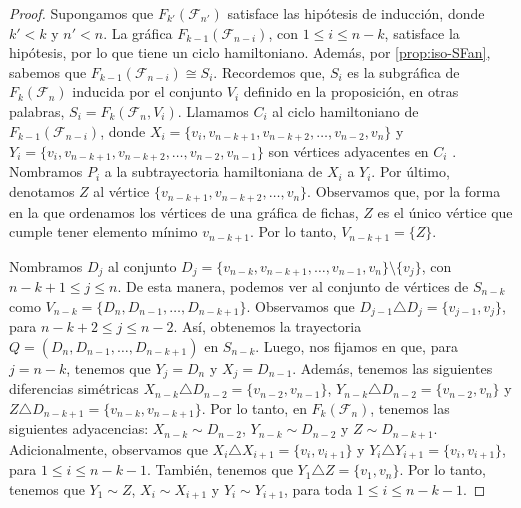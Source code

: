 \begin{proof}
    Supongamos que $F_{k'}(\mathcal{F}_{n'})$ satisface las hip\'otesis de
    inducci\'on, donde $k'< k$ y $n'<n$. La gr\'afica
    $F_{k-1}(\mathcal{F}_{n-i})$, con $1 \leq i \leq n-k$, satisface la
    hip\'otesis, por lo que tiene un ciclo hamiltoniano. Adem\'as, por
    \cref{prop:iso-SFan}, sabemos que 
    \linebreak
    $F_{k-1}(\mathcal{F}_{n-i}) \cong S_i$. Recordemos que,  $S_i$ es la
    subgr\'afica de $F_k(\mathcal{F}_n)$ inducida por el conjunto $V_i$ definido
    en la proposici\'on, en otras palabras, $S_i= F_k(\mathcal{F}_n, V_i)$.
    Llamamos $C_i$ al ciclo hamiltoniano de $F_{k-1}(\mathcal{F}_{n-i})$, donde
    $X_i = \{v_i, v_{n-k+1}, v_{n-k+2}, \dots, v_{n-2}, v_n\}$ y $Y_i= \{v_i,
    v_{n-k+1}, v_{n-k+2}, \dots, v_{n-2}, v_{n-1}\}$ son v\'ertices adyacentes
    en $C_i$ . Nombramos $P_i$ a la subtrayectoria hamiltoniana de $X_i$ a
    $Y_i$. Por \'ultimo, denotamos $Z$ al v\'ertice $\{v_{n-k+1}, v_{n-k+2},
    \dots, v_n\}$. Observamos que, por la forma en la que ordenamos los
    v\'ertices de una gr\'afica de fichas, $Z$ es el \'unico v\'ertice que
    cumple tener elemento m\'inimo $v_{n-k+1}$. Por lo tanto, $V_{n-k+1} =
    \{Z\}$. 
    
    Nombramos $D_j$ al conjunto $D_j =\{v_{n-k}, v_{n-k+1}, \dots, v_{n-1},
    v_n\} \setminus \{v_j\}$, con 
    \linebreak
    $n-k+1 \leq j \leq n$.  De esta manera,
    podemos ver al conjunto de v\'ertices de $S_{n-k}$ como $V_{n-k}=\{D_n,
    D_{n-1}, \dots, D_{n-k+1}\}$. Observamos que $D_{j-1} \triangle D_j=
    \{v_{j-1}, v_j\}$, para $n-k+2 \leq j \leq n-2$. As\'i, obtenemos
    la trayectoria $Q= (D_n, D_{n-1}, \dots, D_{n-k+1})$ en $S_{n-k}$.     
    Luego, nos fijamos en que, para $j= n-k$, tenemos que $Y_j = D_n$ y $X_j=
    D_{n-1}$. Adem\'as, tenemos las siguientes diferencias sim\'etricas
    $X_{n-k}\triangle D_{n-2} =\{v_{n-2}, v_{n-1}\}$, $Y_{n-k}\triangle D_{n-2}
    =\{v_{n-2}, v_n\}$ y $Z\triangle D_{n-k+1} =\{v_{n-k}, v_{n-k+1}\}$. Por lo
    tanto, en $F_k(\mathcal{F}_n)$, tenemos las siguientes adyacencias: $X_{n-k}
    \sim D_{n-2}$, $Y_{n-k} \sim D_{n-2}$ y $Z \sim D_{n-k+1}$. Adicionalmente,
    observamos que $X_{i} \triangle X_{i+1}= \{v_i, v_{i+1}\}$ y $Y_i \triangle
    Y_{i+1} = \{v_i, v_{i+1}\}$, para $1 \leq i \leq n- k- 1$. Tambi\'en,
    tenemos que $Y_1 \triangle Z = \{v_1, v_n\}$. Por lo tanto, tenemos que $Y_1
    \sim Z$, $X_i \sim X_{i+1}$ y $Y_i \sim Y_{i+1}$, para toda $1 \leq i \leq
    n-k-1$.
            

\end{proof}
